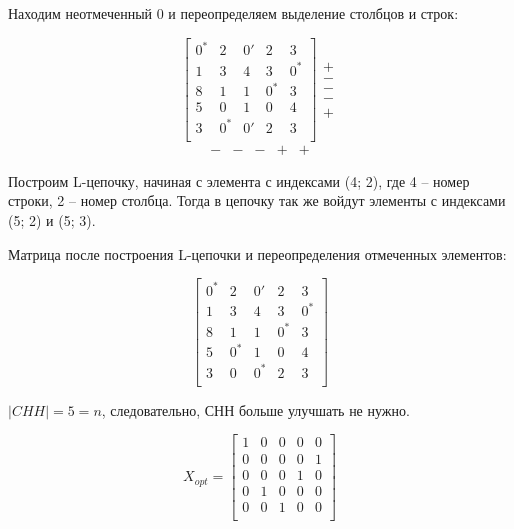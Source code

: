 \documentclass[a4paper,14pt]{article}
\begin{document}
Находим неотмеченный 0 и переопределяем выделение столбцов и строк:

\begin{equation}
\begin{bmatrix}
0^* &	2  & 	0'   &	2   &	3 	\\ 
1  &	3  & 	4   &	3   &	0^* \\
8  &	1  & 	1   &	0^* & 	3 	\\
5  & 	0  & 	1   &	0   &	4 	\\
3  &	0^*  & 	0'  &	2   &	3 	\\
\end{bmatrix}
\begin{matrix}
+ \\
- \\
- \\
- \\
+
\end{matrix}
\end{equation}
\begin{equation}
\begin{matrix}
- & - & - & + & +
\end{matrix}
\end{equation}

Построим L-цепочку, начиная с элемента с индексами (4; 2), где 4 -- номер строки, 2 -- номер столбца. Тогда в цепочку так же войдут элементы с индексами (5; 2) и (5; 3).

Матрица после построения L-цепочки и  переопределения отмеченных элементов:

\begin{equation}
\begin{bmatrix}
0^* &	2  & 	0'   &	2   &	3 	\\ 
1  &	3  & 	4   &	3   &	0^* \\
8  &	1  & 	1   &	0^* & 	3 	\\
5  & 	0^* & 	1   &	0   &	4 	\\
3  &	0  & 	0^*  &	2   &	3 	\\
\end{bmatrix}
\end{equation}

$|CHH| = 5 = n$, следовательно, СНН больше улучшать не нужно. 

\begin{equation} X_{opt} = 
\begin{bmatrix}
1  &	0  & 	0   &	0   &	0 	\\ 
0  &	0  & 	0   &	0   &	1   \\
0  &	0  & 	0   &	1   & 	0 	\\
0  & 	1  & 	0   &	0   &	0 	\\
0  &	0  & 	1   &	0   &	0 	\\
\end{bmatrix}
\end{equation}
\end{document}
